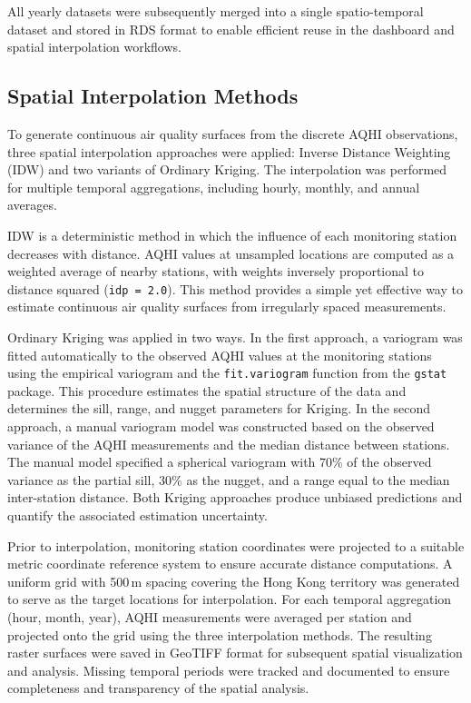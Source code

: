 \documentclass[manuscript,nonacm]{acmart}
\begin{document}
        All yearly datasets were subsequently merged into a single spatio-temporal dataset and stored in RDS format to enable efficient reuse in the dashboard and spatial interpolation workflows.

    \subsection{Spatial Interpolation Methods}

        To generate continuous air quality surfaces from the discrete AQHI observations, three spatial interpolation approaches were applied: Inverse Distance Weighting (IDW) and two variants of Ordinary Kriging. The interpolation was performed for multiple temporal aggregations, including hourly, monthly, and annual averages.

        IDW is a deterministic method in which the influence of each monitoring station decreases with distance. AQHI values at unsampled locations are computed as a weighted average of nearby stations, with weights inversely proportional to distance squared (\texttt{idp = 2.0}). This method provides a simple yet effective way to estimate continuous air quality surfaces from irregularly spaced measurements.

        Ordinary Kriging was applied in two ways. In the first approach, a variogram was fitted automatically to the observed AQHI values at the monitoring stations using the empirical variogram and the \texttt{fit.variogram} function from the \texttt{gstat} package. This procedure estimates the spatial structure of the data and determines the sill, range, and nugget parameters for Kriging. In the second approach, a manual variogram model was constructed based on the observed variance of the AQHI measurements and the median distance between stations. The manual model specified a spherical variogram with 70\% of the observed variance as the partial sill, 30\% as the nugget, and a range equal to the median inter-station distance. Both Kriging approaches produce unbiased predictions and quantify the associated estimation uncertainty.

        Prior to interpolation, monitoring station coordinates were projected to a suitable metric coordinate reference system to ensure accurate distance computations. A uniform grid with 500\,m spacing covering the Hong Kong territory was generated to serve as the target locations for interpolation. For each temporal aggregation (hour, month, year), AQHI measurements were averaged per station and projected onto the grid using the three interpolation methods. The resulting raster surfaces were saved in GeoTIFF format for subsequent spatial visualization and analysis. Missing temporal periods were tracked and documented to ensure completeness and transparency of the spatial analysis.
\end{document}
